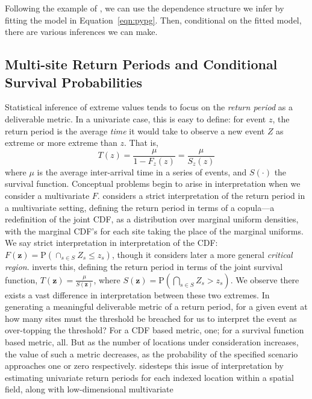 Following the example of \cite{trubey:pg}, we can use the dependence structure we infer
    by fitting the model in Equation~\eqref{eqn:pypg}.  Then, conditional on the fitted model,
    there are various inferences we can make.

\subsection{Multi-site Return Periods and Conditional Survival Probabilities}
Statistical inference of extreme values tends to focus on the \emph{return period} as a 
    deliverable metric.  In a univariate case, this is easy to define: for event $z$, 
    the return period is the average \emph{time} it would take to observe a new event 
    $Z$ as extreme or more extreme than $z$.  That is,
    \[
    T(z) = \frac{\mu}{1 - F_z(z)} = \frac{\mu}{S_z(z)}
    \]
    where $\mu$ is the average inter-arrival time in a series of events, and $S(\cdot)$ 
    the survival function.  Conceptual problems begin to arise in interpretation when 
    we consider a multivariate $F$.  \cite{salvadori2010} considers a strict interpretation 
    of the return period in a multivariate setting, defining the return period in terms of 
    a copula---a redefinition of the joint CDF, as a distribution over marginal uniform 
    densities, with the marginal CDF's for each site taking the place of the marginal 
    uniforms.  We say strict interpretation in interpretation of the CDF: 
    $F(\bm{z}) = \text{P}\left(\cap_{s \in S}Z_s\leq z_s\right)$, though it considers 
    later a more general \emph{critical region}.
    \cite{Salvadori2013} inverts this, defining the return period in terms of the joint 
    survival function, $T(\bm{z}) = \frac{\mu}{S(\bm{z})}$, where 
    $S(\bm{z}) = \text{P}\left(\bigcap_{s\in S}Z_s > z_s\right)$.
    We observe there exists a vast difference in interpretation between these two extremes.  
    In generating a meaningful deliverable metric of a return period, for a given event at 
    how many sites must the threshold be breached for us to interpret the event as over-topping 
    the threshold?  For a CDF based metric, one; for a survival function based metric, all.  
    But as the number of locations under consideration increases, the value of such a metric 
    decreases, as the probability of the specified scenario approaches one or zero respectively.
    \cite{cho2023} sidesteps this issue of interpretation by estimating univariate return periods 
    for each indexed location within a spatial field, along with low-dimensional multivariate 
